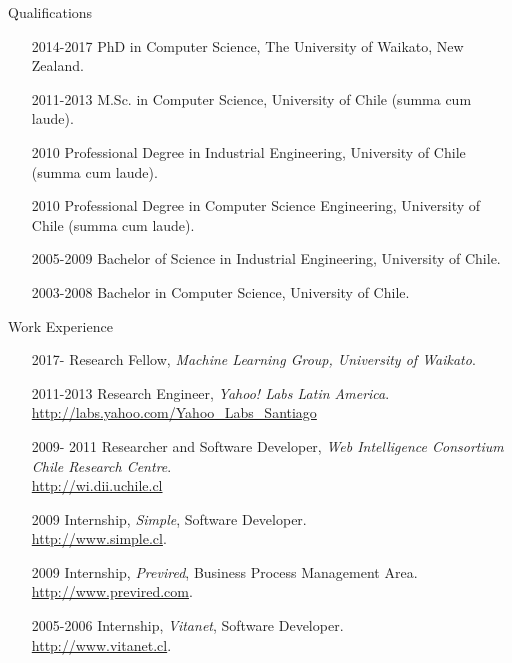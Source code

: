 \documentclass[handout]{beamer}
\begin{document}
\begin{frame}{Qualifications}
\begin{scriptsize}
  \begin{enumerate}
\item[2014-2017] PhD in Computer Science, The University of Waikato, New Zealand.

\item[2011-2013] M.Sc. in Computer Science, University of Chile (summa cum laude).

\item[2010] Professional Degree in Industrial Engineering, University of Chile (summa cum laude).

\item[2010] Professional Degree in Computer Science Engineering, University of Chile (summa cum laude).

\item[2005-2009]  Bachelor of Science in Industrial Engineering, University of Chile.

\item[2003-2008]  Bachelor in Computer Science, University of Chile.
  \end{enumerate} 
\end{scriptsize}

\end{frame}




\begin{frame}{Work Experience}
\begin{scriptsize}
  \begin{enumerate}
\item[ 2017-] Research Fellow, \textit{Machine Learning Group, University of Waikato}. \\
\item[2011-2013] Research Engineer, \textit{Yahoo! Labs Latin America}. \\ \url{http://labs.yahoo.com/Yahoo_Labs_Santiago} 
\item[2009- 2011] Researcher and Software Developer, \textit{Web Intelligence Consortium Chile Research Centre}.    \\ \url{http://wi.dii.uchile.cl}
\item[2009] Internship, \textit{Simple}, Software Developer. \\ \url{http://www.simple.cl}.
\item[2009] Internship, \textit{Previred}, Business Process Management Area. \\ \url{http://www.previred.com}.
\item[2005-2006] Internship, \textit{Vitanet}, Software Developer. \\ \url{http://www.vitanet.cl}. 
  \end{enumerate} 
\end{scriptsize}

\end{frame}
\end{document}
